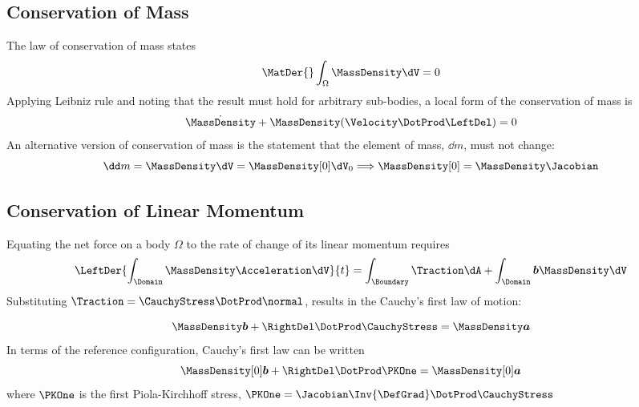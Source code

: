 \documentclass[10pt]{article}
\begin{document}
\subsection{Conservation of Mass }
The law of conservation of mass states
%
\begin{equation}
  \label{eq:cons.mass.1}
  \MatDer{}\int_{\Omega}\MassDensity\dV = 0
\end{equation}
%
Applying Leibniz rule and noting that the result must hold for arbitrary
sub-bodies, a local form of the conservation of mass is
%
\begin{equation}
  \label{eq:cons.mass.2}
  \dot{\MassDensity} + \MassDensity(\Velocity\DotProd\LeftDel) = 0
\end{equation}
%
An alternative version of conservation of mass is the statement that the element
of mass, $\dd m$, must not change:
%
\begin{equation}
  \label{eq:cons.mass.3}
  \dd m = \MassDensity\dV = \MassDensity[0]\dV_0
  \Longrightarrow
  \MassDensity[0] = \MassDensity\Jacobian
\end{equation}

\subsection{Conservation of Linear Momentum}
Equating the net force on a body $\Omega$ to the rate of change of its linear
momentum requires
%
\begin{equation}
  \label{eq:lin.mom.bal.0}
  \LeftDer{\int_{\Domain}\MassDensity\Acceleration\dV}{t} = {
    \int_{\Boundary}\Traction\dA +
    \int_{\Domain}\boldsymbol{b}\MassDensity\dV
  }
\end{equation}
%
%
Substituting $\Traction=\CauchyStress\DotProd\normal$, results in the Cauchy's first law of motion:

%
\begin{equation}
  \label{eq:cauchy.first.law.0}
  \MassDensity\boldsymbol{b} + \RightDel\DotProd\CauchyStress = \MassDensity\boldsymbol{a}
\end{equation}
%
In terms of the reference configuration, Cauchy's first law can be written
%
\begin{equation}
  \label{eq:cauchy.first.law.1}
  \MassDensity[0]\boldsymbol{b} + \RightDel\DotProd\PKOne
  = \MassDensity[0]\boldsymbol{a}
\end{equation}
%
where $\PKOne$ is the first Piola-Kirchhoff stress, $\PKOne = \Jacobian\Inv{\DefGrad}\DotProd\CauchyStress$
\end{document}
